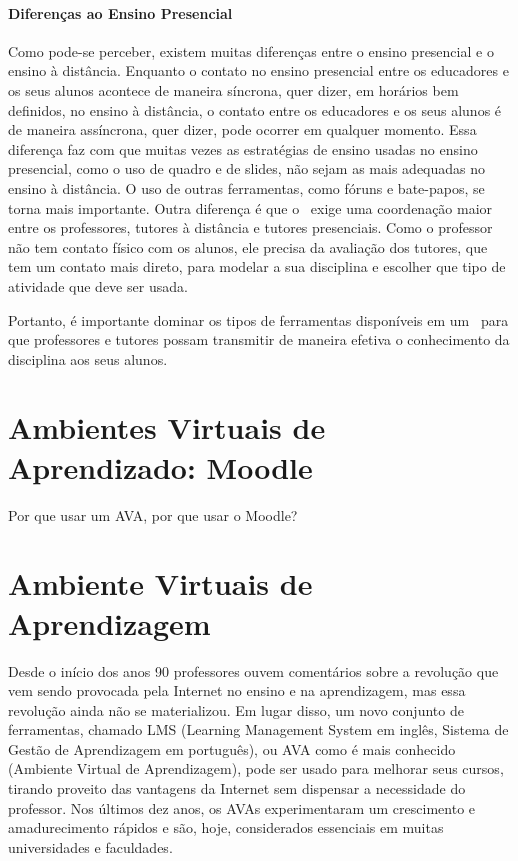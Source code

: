 \paragraph{Diferenças ao Ensino Presencial} Como pode-se perceber, existem muitas diferenças entre o ensino presencial e 
o ensino à distância. Enquanto o contato no ensino presencial entre os educadores e os seus alunos acontece de maneira síncrona, 
quer dizer, em horários bem definidos, no ensino à distância, o contato entre os educadores e os seus alunos é de maneira
assíncrona, quer dizer, pode ocorrer em qualquer momento. Essa diferença faz com que muitas vezes as estratégias de ensino usadas no ensino 
presencial, como o uso de quadro e de slides, não sejam as mais adequadas no ensino à distância. O uso de outras ferramentas, 
como fóruns e bate-papos, se torna mais importante. Outra diferença é que o \ead\ exige uma coordenação maior entre os professores, tutores
à distância e tutores presenciais. Como o professor não tem contato físico com os alunos, ele precisa da avaliação dos tutores, 
que tem um contato mais direto, para modelar a sua disciplina e escolher que tipo de atividade que deve ser usada.

Portanto, é importante dominar os tipos de ferramentas disponíveis em um \ava\ para que professores e tutores possam 
transmitir de maneira efetiva o conhecimento da disciplina aos seus alunos.


\section{Ambientes Virtuais de Aprendizado: Moodle}
\label{subsec:cap1:Moodle}

Por que usar um AVA, por que usar o Moodle?

\section{Ambiente Virtuais de Aprendizagem}

Desde o início dos anos 90 professores ouvem comentários sobre a revolução que vem sendo provocada pela Internet no ensino e na aprendizagem, mas essa revolução ainda não se materializou. Em lugar disso, um novo conjunto de ferramentas, chamado LMS (Learning Management System em inglês, Sistema de Gestão de Aprendizagem em português), ou AVA como é mais conhecido (Ambiente Virtual de Aprendizagem), pode ser usado para melhorar seus cursos, tirando proveito das vantagens da Internet sem dispensar a necessidade do professor. Nos últimos dez anos, os AVAs experimentaram um crescimento e amadurecimento rápidos e são, hoje, considerados essenciais em muitas universidades e faculdades.



